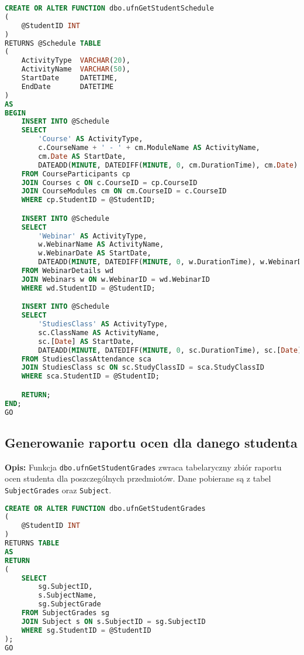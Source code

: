 \documentclass[12pt]{article}
\begin{document}
 
\begin{lstlisting}[language=SQL]
CREATE OR ALTER FUNCTION dbo.ufnGetStudentSchedule
(
    @StudentID INT
)
RETURNS @Schedule TABLE
(
    ActivityType  VARCHAR(20),
    ActivityName  VARCHAR(50),
    StartDate     DATETIME,
    EndDate       DATETIME
)
AS
BEGIN
    INSERT INTO @Schedule
    SELECT 
        'Course' AS ActivityType,
        c.CourseName + ' - ' + cm.ModuleName AS ActivityName,
        cm.Date AS StartDate,
        DATEADD(MINUTE, DATEDIFF(MINUTE, 0, cm.DurationTime), cm.Date) AS EndDate
    FROM CourseParticipants cp
    JOIN Courses c ON c.CourseID = cp.CourseID
    JOIN CourseModules cm ON cm.CourseID = c.CourseID
    WHERE cp.StudentID = @StudentID;

    INSERT INTO @Schedule
    SELECT
        'Webinar' AS ActivityType,
        w.WebinarName AS ActivityName,
        w.WebinarDate AS StartDate,
        DATEADD(MINUTE, DATEDIFF(MINUTE, 0, w.DurationTime), w.WebinarDate) AS EndDate
    FROM WebinarDetails wd
    JOIN Webinars w ON w.WebinarID = wd.WebinarID
    WHERE wd.StudentID = @StudentID;

    INSERT INTO @Schedule
    SELECT
        'StudiesClass' AS ActivityType,
        sc.ClassName AS ActivityName,
        sc.[Date] AS StartDate,
        DATEADD(MINUTE, DATEDIFF(MINUTE, 0, sc.DurationTime), sc.[Date]) AS EndDate
    FROM StudiesClassAttendance sca
    JOIN StudiesClass sc ON sc.StudyClassID = sca.StudyClassID
    WHERE sca.StudentID = @StudentID;

    RETURN;
END;
GO
\end{lstlisting}

\subsection{Generowanie raportu ocen dla danego studenta}
\label{sec:student_grades}

\textbf{Opis:} Funkcja \texttt{dbo.ufnGetStudentGrades} zwraca tabelaryczny zbiór raportu ocen studenta dla poszczególnych przedmiotów. Dane pobierane są z tabel \texttt{SubjectGrades} oraz \texttt{Subject}.

 
\begin{lstlisting}[language=SQL]
CREATE OR ALTER FUNCTION dbo.ufnGetStudentGrades
(
    @StudentID INT
)
RETURNS TABLE
AS
RETURN
(
    SELECT 
        sg.SubjectID,
        s.SubjectName,
        sg.SubjectGrade
    FROM SubjectGrades sg
    JOIN Subject s ON s.SubjectID = sg.SubjectID
    WHERE sg.StudentID = @StudentID
);
GO
\end{lstlisting}
\end{document}
